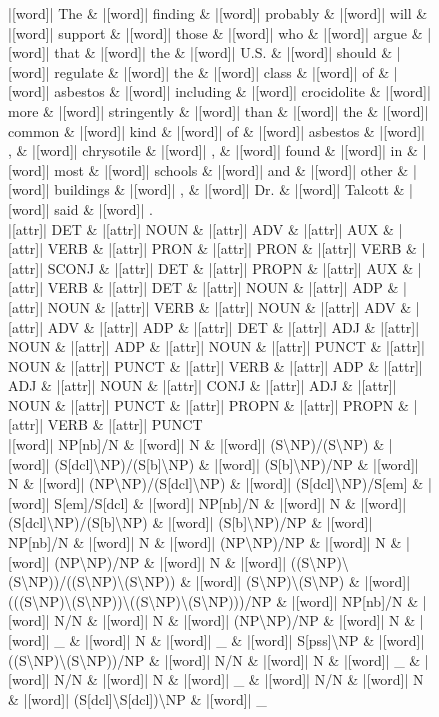 \documentclass[10pt,a4paper]{article}
\begin{document}
\begin{figure}[h]
{\begin{dependency}[theme = simple]
\begin{deptext}[column sep=1em, row sep=0.1em]
|[word]| The \& |[word]| finding \& |[word]| probably \& |[word]| will \& |[word]| support \& |[word]| those \& |[word]| who \& |[word]| argue \& |[word]| that \& |[word]| the \& |[word]| U.S. \& |[word]| should \& |[word]| regulate \& |[word]| the \& |[word]| class \& |[word]| of \& |[word]| asbestos \& |[word]| including \& |[word]| crocidolite \& |[word]| more \& |[word]| stringently \& |[word]| than \& |[word]| the \& |[word]| common \& |[word]| kind \& |[word]| of \& |[word]| asbestos \& |[word]| , \& |[word]| chrysotile \& |[word]| , \& |[word]| found \& |[word]| in \& |[word]| most \& |[word]| schools \& |[word]| and \& |[word]| other \& |[word]| buildings \& |[word]| , \& |[word]| Dr. \& |[word]| Talcott \& |[word]| said \& |[word]| . \\
|[attr]| DET \& |[attr]| NOUN \& |[attr]| ADV \& |[attr]| AUX \& |[attr]| VERB \& |[attr]| PRON \& |[attr]| PRON \& |[attr]| VERB \& |[attr]| SCONJ \& |[attr]| DET \& |[attr]| PROPN \& |[attr]| AUX \& |[attr]| VERB \& |[attr]| DET \& |[attr]| NOUN \& |[attr]| ADP \& |[attr]| NOUN \& |[attr]| VERB \& |[attr]| NOUN \& |[attr]| ADV \& |[attr]| ADV \& |[attr]| ADP \& |[attr]| DET \& |[attr]| ADJ \& |[attr]| NOUN \& |[attr]| ADP \& |[attr]| NOUN \& |[attr]| PUNCT \& |[attr]| NOUN \& |[attr]| PUNCT \& |[attr]| VERB \& |[attr]| ADP \& |[attr]| ADJ \& |[attr]| NOUN \& |[attr]| CONJ \& |[attr]| ADJ \& |[attr]| NOUN \& |[attr]| PUNCT \& |[attr]| PROPN \& |[attr]| PROPN \& |[attr]| VERB \& |[attr]| PUNCT \\
|[word]| NP{[}nb{]}/N \& |[word]| N \& |[word]| (S\textbackslash{}NP)/(S\textbackslash{}NP) \& |[word]| (S{[}dcl{]}\textbackslash{}NP)/(S{[}b{]}\textbackslash{}NP) \& |[word]| (S{[}b{]}\textbackslash{}NP)/NP \& |[word]| N \& |[word]| (NP\textbackslash{}NP)/(S{[}dcl{]}\textbackslash{}NP) \& |[word]| (S{[}dcl{]}\textbackslash{}NP)/S{[}em{]} \& |[word]| S{[}em{]}/S{[}dcl{]} \& |[word]| NP{[}nb{]}/N \& |[word]| N \& |[word]| (S{[}dcl{]}\textbackslash{}NP)/(S{[}b{]}\textbackslash{}NP) \& |[word]| (S{[}b{]}\textbackslash{}NP)/NP \& |[word]| NP{[}nb{]}/N \& |[word]| N \& |[word]| (NP\textbackslash{}NP)/NP \& |[word]| N \& |[word]| (NP\textbackslash{}NP)/NP \& |[word]| N \& |[word]| ((S\textbackslash{}NP)\textbackslash{}(S\textbackslash{}NP))/((S\textbackslash{}NP)\textbackslash{}(S\textbackslash{}NP)) \& |[word]| (S\textbackslash{}NP)\textbackslash{}(S\textbackslash{}NP) \& |[word]| (((S\textbackslash{}NP)\textbackslash{}(S\textbackslash{}NP))\textbackslash{}((S\textbackslash{}NP)\textbackslash{}(S\textbackslash{}NP)))/NP \& |[word]| NP{[}nb{]}/N \& |[word]| N/N \& |[word]| N \& |[word]| (NP\textbackslash{}NP)/NP \& |[word]| N \& |[word]| \_ \& |[word]| N \& |[word]| \_ \& |[word]| S{[}pss{]}\textbackslash{}NP \& |[word]| ((S\textbackslash{}NP)\textbackslash{}(S\textbackslash{}NP))/NP \& |[word]| N/N \& |[word]| N \& |[word]| \_ \& |[word]| N/N \& |[word]| N \& |[word]| \_ \& |[word]| N/N \& |[word]| N \& |[word]| (S{[}dcl{]}\textbackslash{}S{[}dcl{]})\textbackslash{}NP \& |[word]| \_ \\
\end{deptext}


\end{dependency}}
\end{figure}
\end{document}
